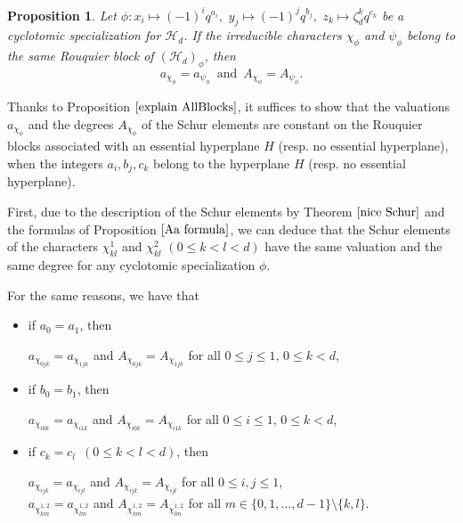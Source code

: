 \documentclass[10pt,a4paper,titlepage]{article}
\newtheorem{proposition}[theorem]{Proposition}
\begin{document}
\begin{proposition}\label{final a}
Let $\phi: x_i \mapsto (-1)^iq^{a_i}, \,\,
 y_j \mapsto (-1)^jq^{b_j}, \,\,
 z_k \mapsto \zeta_d^kq^{c_k}$
be a cyclotomic specialization for $\mathcal{H}_d$. If the irreducible characters $\chi_\phi$ and $\psi_\phi$ belong to the same Rouquier block of $(\mathcal{H}_{d})_\phi$, then 
$$a_{\chi_\phi}=a_{\psi_\phi} \,\textrm{ and }\, A_{\chi_\phi}=A_{\psi_\phi} .$$
\end{proposition}
\begin{apod}{Thanks to Proposition $\ref{explain AllBlocks}$, it suffices to show that 
the valuations $a_{\chi_\phi}$ and the degrees $A_{\chi_\phi}$ of the Schur elements are constant on the Rouquier blocks associated with an essential hyperplane $H$ (resp. no essential hyperplane), when the integers $a_i,b_j,c_k$ belong to the hyperplane $H$ (resp. no essential hyperplane).

First, due to the description of the Schur elements by Theorem $\ref{nice Schur}$ and the formulas of Proposition $\ref{Aa formula}$, we can deduce that the Schur elements of the characters $\chi_{kl}^1$ and $\chi_{kl}^2$ $(0 \leq k<l<d)$ have the same valuation and the same degree for any cyclotomic specialization $\phi$.

For the same reasons, we have that
\begin{itemize}
\item if $a_0=a_1$, then 
\begin{center}
$a_{\chi_{0jk}}=a_{\chi_{1jk}}$ and $A_{\chi_{0jk}}=A_{\chi_{1jk}}$ for all 
$0\leq j \leq 1,\, 0 \leq k<d$,
\end{center} 
\item if $b_0=b_1$, then 
\begin{center}
$a_{\chi_{i0k}}=a_{\chi_{i1k}}$ and $A_{\chi_{i0k}}=A_{\chi_{i1k}}$ for all 
$0\leq i \leq 1,\, 0 \leq k<d$,
\end{center}
\item if $c_k=c_l$\, $(0 \leq k<l<d)$, then
\begin{center}
$a_{\chi_{ijk}}=a_{\chi_{ijl}}$ and $A_{\chi_{ijk}}=A_{\chi_{ijl}}$ for all 
$0\leq i,j \leq 1$,\\$ $\\
$a_{\chi_{km}^{1,2}}=a_{\chi_{lm}^{1,2}}$ and $A_{\chi_{km}^{1,2}}=A_{\chi_{lm}^{1,2}}$ for all 
$ m \in \{0,1,\ldots,d-1\}\setminus \{k,l\}$.
\end{center}
\end{itemize}

}
\end{apod}
\end{document}
